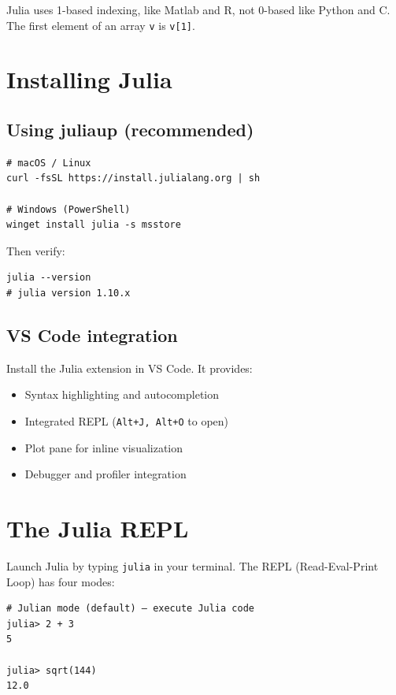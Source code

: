 \begin{juliatip}
Julia uses 1-based indexing, like Matlab and R, not 0-based like Python and C. The first element of an array \texttt{v} is \texttt{v[1]}.
\end{juliatip}

\section{Installing Julia}

\subsection{Using juliaup (recommended)}

\begin{verbatim}
# macOS / Linux
curl -fsSL https://install.julialang.org | sh

# Windows (PowerShell)
winget install julia -s msstore
\end{verbatim}

Then verify:
\begin{verbatim}
julia --version
# julia version 1.10.x
\end{verbatim}

\subsection{VS Code integration}

Install the Julia extension in VS Code. It provides:
\begin{itemize}
  \item Syntax highlighting and autocompletion
  \item Integrated REPL (\texttt{Alt+J, Alt+O} to open)
  \item Plot pane for inline visualization
  \item Debugger and profiler integration
\end{itemize}

\section{The Julia REPL}

Launch Julia by typing \texttt{julia} in your terminal. The REPL (Read-Eval-Print Loop) has four modes:

\begin{verbatim}
# Julian mode (default) — execute Julia code
julia> 2 + 3
5

julia> sqrt(144)
12.0
\end{verbatim}

